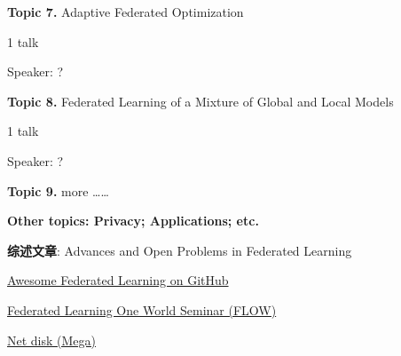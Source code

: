 \vspace{2em}

{\bfseries \large Topic 7.} Adaptive Federated Optimization \cite{reddi2020fed_opt}

1 talk

Speaker: ?

\vspace{2em}

{\bfseries \large Topic 8.} Federated Learning of a Mixture of Global and Local Models \cite{hanzely2020federated}

1 talk

Speaker: ?

\vspace{2em}

{\bfseries \large Topic 9.} more \ldots\ldots

\vspace{3em}

{\bfseries \Large Other topics: Privacy; Applications; etc.}


\vspace{3em}


{\bfseries \Large 综述文章}: Advances and Open Problems in Federated Learning \cite{kairouz2019advances_fl}

\vspace{2em}

\href{https://github.com/chaoyanghe/Awesome-Federated-Learning}{Awesome Federated Learning on GitHub}

\vspace{2em}

\href{https://sites.google.com/view/one-world-seminar-series-flow/home}{Federated Learning One World Seminar (FLOW)}

\vspace{2em}

\href{https://mega.nz/folder/tNoiCbQR#_HgtoFiy4PYc4Uf8-9tYTQ}{Net disk (Mega)}






